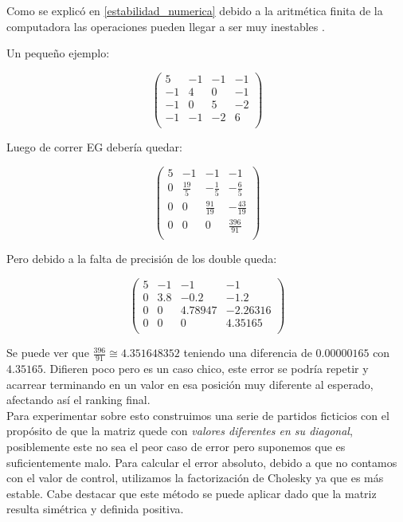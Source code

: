 Como se explicó en \ref{estabilidad_numerica} debido a la aritmética finita de la computadora
las operaciones pueden llegar a ser muy inestables \cite{arithmetic}.

Un pequeño ejemplo:

$$\begin{pmatrix}
    5 & -1 & -1 & -1 \\
    -1 & 4 & 0 & -1 \\
    -1 & 0 & 5 & -2 \\
    -1 & -1 & -2 & 6 \\
\end{pmatrix}$$

Luego de correr EG debería quedar:

$$\begin{pmatrix}
    5 & -1 & -1 & -1 \\
    0 & \frac{19}{5} & -\frac{1}{5} & -\frac{6}{5} \\
    0 & 0 & \frac{91}{19} & -\frac{43}{19} \\
    0 & 0 & 0 & \frac{396}{91} \\
\end{pmatrix}$$

Pero debido a la falta de precisión de los double queda:

$$\begin{pmatrix}
    5 & -1 & -1 & -1 \\
    0 & 3.8 & -0.2 & -1.2 \\
    0 & 0 & 4.78947 & -2.26316 \\
    0 & 0 & 0 & 4.35165 \\
\end{pmatrix}$$

Se puede ver que $\frac{396}{91} \cong 4.351648352$ teniendo una diferencia de $0.00000165$ con $4.35165$.
Difieren poco pero es un caso chico, este error se podría repetir y acarrear terminando en un valor en esa posición muy diferente al esperado, afectando así el ranking final.\\

Para experimentar sobre esto construimos una serie de partidos ficticios con el propósito de que la matriz quede con \textit{valores diferentes en su diagonal}, posiblemente este no sea el peor caso de error pero suponemos que es suficientemente malo. Para calcular el error absoluto, debido a que no contamos con el valor de control, utilizamos la factorización de Cholesky ya que es más estable. Cabe destacar que este método se puede aplicar dado que la matriz resulta simétrica y definida positiva\cite{CMMpaper}.\\

